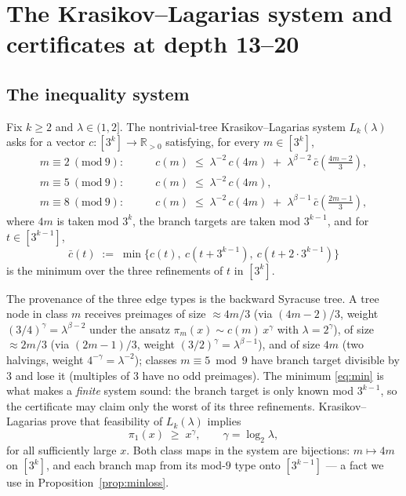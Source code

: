 \documentclass[11pt]{article}
\theoremstyle{definition}
\theoremstyle{remark}
\newcommand{\R}{\mathbb{R}}
\newcommand{\lam}{\lambda}
\newcommand{\gam}{\gamma}
\newcommand{\bet}{\beta}
\begin{document}
\section{The Krasikov--Lagarias system and certificates at depth 13--20}
\label{sec:kl}

\subsection{The inequality system}

Fix $k \geq 2$ and $\lam \in (1,2]$. The nontrivial-tree Krasikov--Lagarias
system $L_k(\lam)$ \cite{KL03} asks for a vector
$c : [3^k] \to \R_{>0}$ satisfying, for every $m \in [3^k]$,
\begin{align}
m \equiv 2 \ (\mathrm{mod}\ 9): &\qquad
c(m) \;\leq\; \lam^{-2}\, c(4m) \;+\; \lam^{\bet-2}\, \bar c\!\left(\tfrac{4m-2}{3}\right),
\label{eq:L1}\\
m \equiv 5 \ (\mathrm{mod}\ 9): &\qquad
c(m) \;\leq\; \lam^{-2}\, c(4m),
\label{eq:L2}\\
m \equiv 8 \ (\mathrm{mod}\ 9): &\qquad
c(m) \;\leq\; \lam^{-2}\, c(4m) \;+\; \lam^{\bet-1}\, \bar c\!\left(\tfrac{2m-1}{3}\right),
\label{eq:L3}
\end{align}
where $4m$ is taken mod $3^k$, the branch targets are taken mod $3^{k-1}$, and
for $t \in [3^{k-1}]$,
\begin{equation}
\bar c(t) \;:=\; \min\bigl\{ c(t),\ c(t + 3^{k-1}),\ c(t + 2 \cdot 3^{k-1}) \bigr\}
\label{eq:min}
\end{equation}
is the minimum over the three refinements of $t$ in $[3^k]$.

The provenance of the three edge types is the backward Syracuse tree. A tree
node in class $m$ receives preimages of size $\approx 4m/3$ (via
$(4m-2)/3$, weight $(3/4)^{\gam} = \lam^{\bet-2}$ under the ansatz
$\pi_m(x) \sim c(m)\, x^{\gam}$ with $\lam = 2^{\gam}$), of size $\approx 2m/3$
(via $(2m-1)/3$, weight $(3/2)^{\gam} = \lam^{\bet-1}$), and of size $4m$
(two halvings, weight $4^{-\gam} = \lam^{-2}$); classes $m \equiv 5 \bmod 9$
have branch target divisible by $3$ and lose it (multiples of $3$ have no odd
preimages). The minimum \eqref{eq:min} is what makes a \emph{finite} system
sound: the branch target is only known mod $3^{k-1}$, so the certificate may
claim only the worst of its three refinements. Krasikov--Lagarias prove
\cite{KL03} that feasibility of $L_k(\lam)$ implies
\[
\pi_1(x) \;\geq\; x^{\gam}, \qquad \gam = \log_2 \lam ,
\]
for all sufficiently large $x$. Both class maps in the system are bijections:
$m \mapsto 4m$ on $[3^k]$, and each branch map from its mod-$9$ type onto
$[3^{k-1}]$ --- a fact we use in Proposition~\ref{prop:minloss}.
\end{document}
